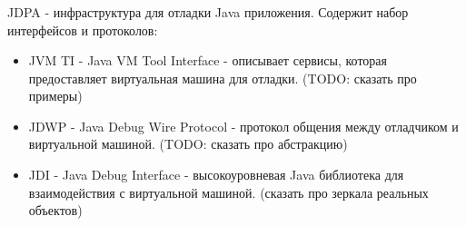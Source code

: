 \begin{frame}
\frametitle{\insertsection} 
\framesubtitle{\insertsubsection}
JDPA - инфраструктура для отладки Java приложения. Содержит набор интерфейсов и протоколов:
\begin{itemize}
	\item JVM TI - Java VM Tool Interface - описывает сервисы, которая предоставляет виртуальная машина для отладки. (TODO: сказать про примеры)
	\item JDWP - Java Debug Wire Protocol - протокол общения между отладчиком и виртуальной машиной. (TODO: сказать про абстракцию)
	\item JDI - Java Debug Interface - высокоуровневая Java библиотека для взаимодействия с виртуальной машиной. (сказать про зеркала реальных объектов)
\end{itemize}
\end{frame}
